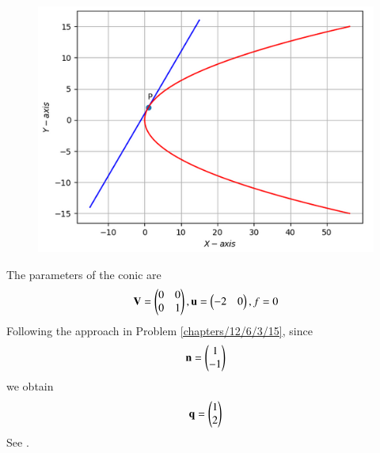 	\begin{figure}[!h]
		\centering
 \includegraphics[width=\columnwidth]{chapters/12/6/3/27/figs/conicfig.png}
		\caption{}
		\label{fig:12/6/3/27}
  	\end{figure}
The parameters of the conic are
\begin{align}
 \mathbf{V} = \begin{pmatrix}0&0\\0&1\end{pmatrix},  \mathbf{u} = \begin{pmatrix}-2&0\end{pmatrix}, f = 0 
\end{align}
Following the approach in Problem 
\ref{chapters/12/6/3/15},
since
\begin{align}
	\mathbf{n} = \begin{pmatrix}1 \\ -1\end{pmatrix}
\end{align}
we obtain
\begin{align}
	\mathbf{q} = \begin{pmatrix}1 \\ 2\end{pmatrix}
\end{align}
See 
		.

